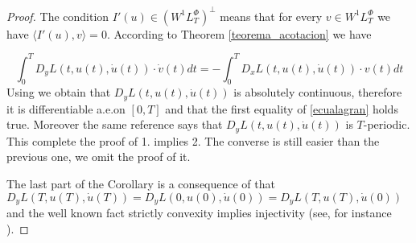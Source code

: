 \documentclass[twoside]{article}
\newcommand{\lphi}{L^{\Phi}}
\newcommand{\wphi}{W^{1}\lphi}
\begin{document}
\begin{proof} The condition $I'(u)\in\left( \wphi_T\right)^{\perp}$ means that for every $v\in \wphi_T$ we have $\langle I'(u),v\rangle=0$. According to Theorem
\ref{teorema_acotacion} we have

\[\int_0^TD_yL(t,u(t),\dot{u}(t))\cdot \dot{v}(t)dt=-\int_0^TD_xL(t,u(t),\dot{u}(t))\cdot v(t)dt \]
Using \cite[pag. 6]{mawhin2010critical} we obtain that $D_yL(t,u(t),\dot{u}(t))$ is absolutely continuous, therefore it is differentiable a.e.on $[0,T]$ and that the first equality
of \ref{ecualagran} holds true. Moreover the same reference says that $D_yL(t,u(t),\dot{u}(t))$ is $T$-periodic.
This complete the proof of 1. implies 2. The converse is still easier than the previous one, we omit the proof of it.

The last part of the Corollary is a consequence of that $D_yL(T,u(T),\dot{u}(T))=D_yL(0,u(0),\dot{u}(0))=D_yL(T,u(T),\dot{u}(0))$ and the well known fact strictly
convexity implies injectivity (see, for instance \cite[Theorem 12.17]{rockafellar2009variational}).




\end{proof}
 
 



\end{document}
